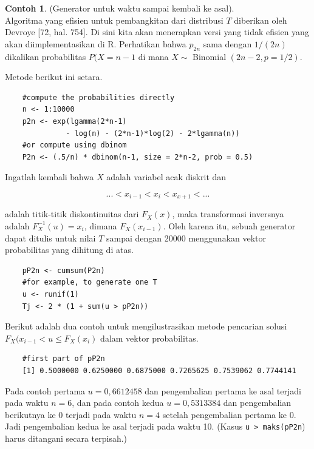 \documentclass[a4paper,12pt]{article}
\theoremstyle{definition}
\newtheorem{example}{Contoh}[section]
\begin{document}
\begin{example} (Generator untuk waktu sampai kembali ke asal). \label{K1C6}\\
Algoritma yang efisien untuk pembangkitan dari distribusi $T$ diberikan oleh Devroye [72, hal. 754]. Di sini kita akan menerapkan versi yang tidak efisien yang akan diimplementasikan di R. Perhatikan bahwa $p_{2n}$ sama dengan $1/(2n)$ dikalikan probabilitas $P(X = n - 1$ di mana $X \sim$ Binomial $(2n - 2, p = 1/2)$.

Metode berikut ini setara.
    
    \begin{lstlisting}
    #compute the probabilities directly
    n <- 1:10000
    p2n <- exp(lgamma(2*n-1)
              - log(n) - (2*n-1)*log(2) - 2*lgamma(n))
    #or compute using dbinom
    P2n <- (.5/n) * dbinom(n-1, size = 2*n-2, prob = 0.5)
    \end{lstlisting}

Ingatlah kembali bahwa $X$ adalah variabel acak diskrit dan

\begin{equation*}
    ... < x_{i-1} < x_i < x_{x+1} < ...
\end{equation*}

adalah titik-titik diskontinuitas dari $F_X (x)$, maka transformasi inversnya adalah $F_X^{-1} (u) = x_i$, dimana $F_X (x_{i-1})$. Oleh karena itu, sebuah generator dapat ditulis untuk nilai $T$ sampai dengan 20000 menggunakan vektor probabilitas yang dihitung di atas.

    \begin{lstlisting}
    pP2n <- cumsum(P2n)
    #for example, to generate one T
    u <- runif(1)
    Tj <- 2 * (1 + sum(u > pP2n))
    \end{lstlisting}

Berikut adalah dua contoh untuk mengilustrasikan metode pencarian solusi $F_X (x_{i-1} < u \leq F_X (x_i)$ dalam vektor probabilitas.

    \begin{lstlisting}
    #first part of pP2n
    [1] 0.5000000 0.6250000 0.6875000 0.7265625 0.7539062 0.7744141
    \end{lstlisting}

Pada contoh pertama $u = 0,6612458$ dan pengembalian pertama ke asal terjadi pada waktu $n = 6$, dan pada contoh kedua $u = 0,5313384$ dan pengembalian berikutnya ke 0 terjadi pada waktu $n = 4$ setelah pengembalian pertama ke 0. Jadi pengembalian kedua ke asal terjadi pada waktu 10. (Kasus \texttt{u > maks(pP2n}) harus ditangani secara terpisah.)


\end{example}
\end{document}
